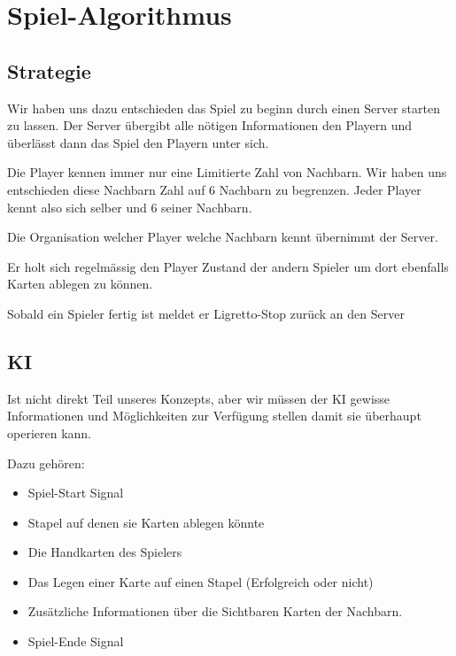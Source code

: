 \section{Spiel-Algorithmus}


\subsection{Strategie}

Wir haben uns dazu entschieden das Spiel zu beginn durch einen Server starten zu lassen. Der Server übergibt alle nötigen Informationen den Playern und überlässt dann das Spiel den Playern unter sich.

Die Player kennen immer nur eine Limitierte Zahl von Nachbarn. Wir haben uns entschieden diese Nachbarn Zahl auf 6 Nachbarn zu begrenzen. Jeder Player kennt also sich selber und 6 seiner Nachbarn.

Die Organisation welcher Player welche Nachbarn kennt übernimmt der Server.

Er holt sich regelmässig den Player Zustand der andern Spieler um dort ebenfalls Karten ablegen zu können.

Sobald ein Spieler fertig ist meldet er Ligretto-Stop zurück an den Server

\subsection{KI}

Ist nicht direkt Teil unseres Konzepts, aber wir müssen der KI gewisse Informationen und Möglichkeiten zur Verfügung stellen damit sie überhaupt operieren kann.

Dazu gehören:
\begin{itemize}
	\item Spiel-Start Signal
	\item Stapel auf denen sie Karten ablegen könnte
	\item Die Handkarten des Spielers
	\item Das Legen einer Karte auf einen Stapel (Erfolgreich oder nicht)
	\item Zusätzliche Informationen über die Sichtbaren Karten der Nachbarn.
	\item Spiel-Ende Signal
\end{itemize}

